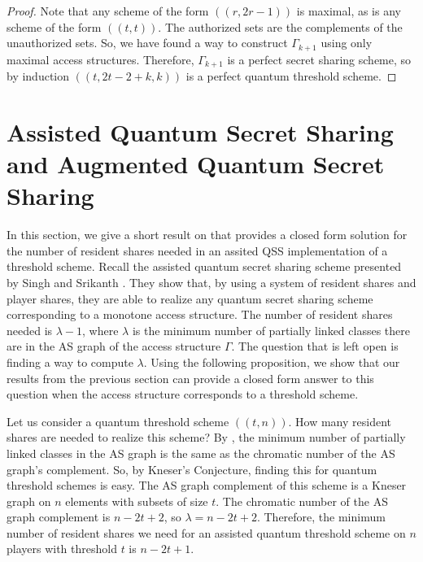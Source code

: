\begin{proof}
    Note that any scheme of the form $((r,2r-1))$ is maximal, as is any scheme of the form $((t,t))$. The authorized sets are the complements of the unauthorized sets. So, we have found a way to construct $\Gamma_{k+1}$ using only maximal access structures. Therefore, $\Gamma_{k+1}$ is a perfect secret sharing scheme, so by induction $((t,2t-2+k,k))$ is a perfect quantum threshold scheme.
\end{proof}

\section{Assisted Quantum Secret Sharing and Augmented Quantum Secret Sharing}
\label{sec:aqss-and-aqss}

In this section, we give a short result on that provides a closed form solution for the number of resident shares needed in an assited QSS implementation of a threshold scheme. Recall the assisted quantum secret sharing scheme presented by Singh and Srikanth \cite{singh_assisted_2004}. They show that, by using a system of resident shares and player shares, they are able to realize any quantum secret sharing scheme corresponding to a monotone access structure. The number of resident shares needed is $\lambda-1$, where $\lambda$ is the minimum number of partially linked classes there are in the AS graph of the access structure $\Gamma$. The question that is left open is finding a way to compute $\lambda$. Using the following proposition, we show that our results from the previous section can provide a closed form answer to this question when the access structure corresponds to a threshold scheme.

Let us consider a quantum threshold scheme $((t,n))$. How many resident shares are needed to realize this scheme? By , the minimum number of partially linked classes in the AS graph is the same as the chromatic number of the AS graph's complement. So, by Kneser's Conjecture, finding this for quantum threshold schemes is easy. The AS graph complement of this scheme is a Kneser graph on $n$ elements with subsets of size $t$. The chromatic number of the AS graph complement is $n-2t+2$, so $\lambda = n-2t+2$. Therefore, the minimum number of resident shares we need for an assisted quantum threshold scheme on $n$ players with threshold $t$ is $n-2t+1$.